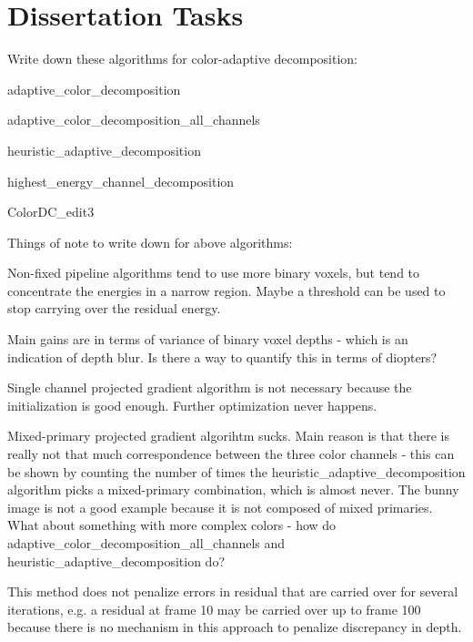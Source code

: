\section{Dissertation Tasks}
\begin{todolist}
\item Write down these algorithms for color-adaptive decomposition:
    \begin{todolist}
    \item adaptive\_color\_decomposition
    \item adaptive\_color\_decomposition\_all\_channels
    \item heuristic\_adaptive\_decomposition
    \item highest\_energy\_channel\_decomposition
    \item ColorDC\_edit3
    \end{todolist}
\item Things of note to write down for above algorithms:
    \begin{todolist}
    \item Non-fixed pipeline algorithms tend to use more binary voxels, but tend to concentrate the energies in a narrow region. Maybe a threshold can be used to stop carrying over the residual energy. 
    \item Main gains are in terms of variance of binary voxel depths - which is an indication of depth blur. Is there a way to quantify this in terms of diopters?
    \item Single channel projected gradient algorithm is not necessary because the initialization is good enough. Further optimization never happens.
    \item Mixed-primary projected gradient algorihtm sucks. Main reason is that there is really not that much correspondence between the three color channels - this can be shown by counting the number of times the heuristic\_adaptive\_decomposition algorithm picks a mixed-primary combination, which is almost never. The bunny image is not a good example because it is not composed of mixed primaries. What about something with more complex colors - how do adaptive\_color\_decomposition\_all\_channels and heuristic\_adaptive\_decomposition do?
    \item This method does not penalize errors in residual that are carried over for several iterations, e.g. a residual at frame 10 may be carried over up to frame 100 because there is no mechanism in this approach to penalize discrepancy in depth.

\end{todolist}
\end{todolist}
